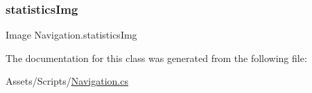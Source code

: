 \mbox{\label{classNavigation_a9595a025ba9a2c6146c59e8fc7b46bde}} 
\subsubsection{\texorpdfstring{statistics\+Img}{statisticsImg}}
{\footnotesize\ttfamily Image Navigation.\+statistics\+Img}



The documentation for this class was generated from the following file\+:\begin{DoxyCompactItemize}
\item 
Assets/\+Scripts/\hyperlink{Navigation_8cs}{Navigation.\+cs}\end{DoxyCompactItemize}
